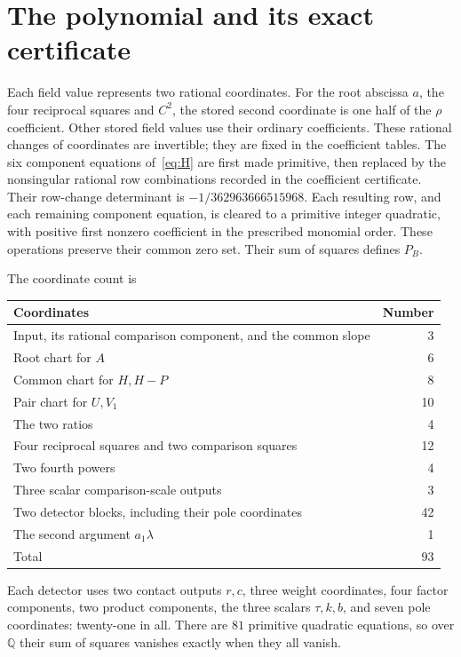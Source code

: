 \documentclass[11pt,a4paper]{article}
\newcommand{\Q}{\mathbb Q}\newcommand{\Z}{\mathbb Z}
\begin{document}
\section{The polynomial and its exact certificate}

Each field value represents two rational coordinates. For the root abscissa
$a$, the four reciprocal squares and $C^2$, the stored second
coordinate is one half of the $\rho$ coefficient. Other stored field
values use their ordinary coefficients. These rational changes of
coordinates are invertible; they are fixed in the coefficient tables.
The six component equations of~\eqref{eq:H} are first made primitive,
then replaced by the nonsingular rational row combinations recorded in
the coefficient certificate. Their row-change determinant is
$-1/362963666515968$. Each resulting row, and each remaining component
equation, is cleared to a primitive integer quadratic, with positive
first nonzero coefficient in the prescribed monomial order.
These operations preserve their common zero set. Their sum of squares
defines $P_B$.

The coordinate count is
\begin{center}
\begin{tabular}{lr}
\toprule
Coordinates & Number\\\midrule
Input, its rational comparison component, and the common slope &3\\
Root chart for $A$ &6\\
Common chart for $H,H-P$ &8\\
Pair chart for $U,V_1$ &10\\
The two ratios &4\\
Four reciprocal squares and two comparison squares &12\\
Two fourth powers &4\\
Three scalar comparison-scale outputs &3\\
Two detector blocks, including their pole coordinates &42\\
The second argument $a_1\lambda$ &1\\\midrule
Total &93\\\bottomrule
\end{tabular}
\end{center}
Each detector uses two contact outputs $r,c$, three weight coordinates,
four factor components, two product components, the three scalars
$\tau,k,b$, and seven pole coordinates: twenty-one in all.
There are $81$ primitive quadratic equations, so over $\Q$ their
sum of squares vanishes exactly when they all vanish.
\end{document}
